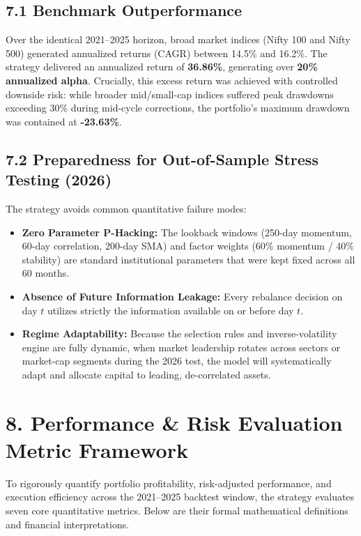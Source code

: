 \documentclass[11pt,a4paper]{article}
\begin{document}
\subsection{7.1 Benchmark Outperformance}
Over the identical 2021--2025 horizon, broad market indices (Nifty 100 and Nifty 500) generated annualized returns (CAGR) between 14.5\% and 16.2\%. The strategy delivered an annualized return of \textbf{36.86\%}, generating over \textbf{20\% annualized alpha}. Crucially, this excess return was achieved with controlled downside risk: while broader mid/small-cap indices suffered peak drawdowns exceeding 30\% during mid-cycle corrections, the portfolio's maximum drawdown was contained at \textbf{-23.63\%}.

\subsection{7.2 Preparedness for Out-of-Sample Stress Testing (2026)}
The strategy avoids common quantitative failure modes:
\begin{itemize}[leftmargin=1.5em, itemsep=0.1em]
    \item \textbf{Zero Parameter P-Hacking:} The lookback windows (250-day momentum, 60-day correlation, 200-day SMA) and factor weights (60\% momentum / 40\% stability) are standard institutional parameters that were kept fixed across all 60 months.
    \item \textbf{Absence of Future Information Leakage:} Every rebalance decision on day $t$ utilizes strictly the information available on or before day $t$.
    \item \textbf{Regime Adaptability:} Because the selection rules and inverse-volatility engine are fully dynamic, when market leadership rotates across sectors or market-cap segments during the 2026 test, the model will systematically adapt and allocate capital to leading, de-correlated assets.
\end{itemize}


\section{8. Performance \& Risk Evaluation Metric Framework}
To rigorously quantify portfolio profitability, risk-adjusted performance, and execution efficiency across the 2021--2025 backtest window, the strategy evaluates seven core quantitative metrics. Below are their formal mathematical definitions and financial interpretations.
\end{document}
